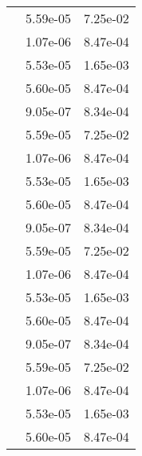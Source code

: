 \begin{table}
\begin{tabular}{c|cc|}
\multicolumn{1}{|c|}{} & \multicolumn{1}{|c|}{  5.59e-05} & \multicolumn{1}{|c|}{  7.25e-02} \\ 
\multicolumn{1}{|c|}{} & \multicolumn{1}{|c|}{  1.07e-06} & \multicolumn{1}{|c|}{  8.47e-04} \\ 
\multicolumn{1}{|c|}{} & \multicolumn{1}{|c|}{  5.53e-05} & \multicolumn{1}{|c|}{  1.65e-03} \\ 
\multicolumn{1}{|c|}{} & \multicolumn{1}{|c|}{  5.60e-05} & \multicolumn{1}{|c|}{  8.47e-04} \\ 
\multicolumn{1}{|c|}{} & \multicolumn{1}{|c|}{  9.05e-07} & \multicolumn{1}{|c|}{  8.34e-04} \\ 
\multicolumn{1}{|c|}{} & \multicolumn{1}{|c|}{  5.59e-05} & \multicolumn{1}{|c|}{  7.25e-02} \\ 
\multicolumn{1}{|c|}{} & \multicolumn{1}{|c|}{  1.07e-06} & \multicolumn{1}{|c|}{  8.47e-04} \\ 
\multicolumn{1}{|c|}{} & \multicolumn{1}{|c|}{  5.53e-05} & \multicolumn{1}{|c|}{  1.65e-03} \\ 
\multicolumn{1}{|c|}{} & \multicolumn{1}{|c|}{  5.60e-05} & \multicolumn{1}{|c|}{  8.47e-04} \\ 
\multicolumn{1}{|c|}{} & \multicolumn{1}{|c|}{  9.05e-07} & \multicolumn{1}{|c|}{  8.34e-04} \\ 
\multicolumn{1}{|c|}{} & \multicolumn{1}{|c|}{  5.59e-05} & \multicolumn{1}{|c|}{  7.25e-02} \\ 
\multicolumn{1}{|c|}{} & \multicolumn{1}{|c|}{  1.07e-06} & \multicolumn{1}{|c|}{  8.47e-04} \\ 
\multicolumn{1}{|c|}{} & \multicolumn{1}{|c|}{  5.53e-05} & \multicolumn{1}{|c|}{  1.65e-03} \\ 
\multicolumn{1}{|c|}{} & \multicolumn{1}{|c|}{  5.60e-05} & \multicolumn{1}{|c|}{  8.47e-04} \\ 
\multicolumn{1}{|c|}{} & \multicolumn{1}{|c|}{  9.05e-07} & \multicolumn{1}{|c|}{  8.34e-04} \\ 
\multicolumn{1}{|c|}{} & \multicolumn{1}{|c|}{  5.59e-05} & \multicolumn{1}{|c|}{  7.25e-02} \\ 
\multicolumn{1}{|c|}{} & \multicolumn{1}{|c|}{  1.07e-06} & \multicolumn{1}{|c|}{  8.47e-04} \\ 
\multicolumn{1}{|c|}{} & \multicolumn{1}{|c|}{  5.53e-05} & \multicolumn{1}{|c|}{  1.65e-03} \\ 
\multicolumn{1}{|c|}{} & \multicolumn{1}{|c|}{  5.60e-05} & \multicolumn{1}{|c|}{  8.47e-04} \\ 

\end{tabular}
\end{table}
